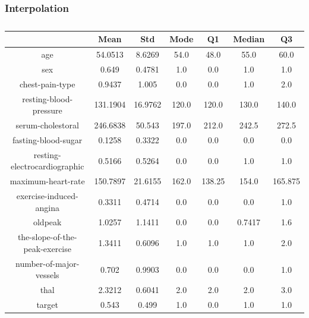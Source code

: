 \documentclass{classrep}
\begin{document}
{{            \subsubsection{Interpolation}
            \label{results:15-percent:interpolation} {
                \begin{table}[!htbp]
                    \centering
                    \begin{tabular}{|c|c|c|c|c|c|c|}
                        \hline
                        & Mean & Std & Mode & Q1 & Median & Q3 \\ \hline
                        age & 54.0513 & 8.6269 & 54.0 & 48.0 & 55.0 & 60.0 \\ \hline
                        sex & 0.649 & 0.4781 & 1.0 & 0.0 & 1.0 & 1.0 \\ \hline
                        chest-pain-type & 0.9437 & 1.005 & 0.0 & 0.0 & 1.0 & 2.0 \\ \hline
                        resting-blood-pressure & 131.1904 & 16.9762 & 120.0 & 120.0 & 130.0 & 140.0 \\ \hline
                        serum-cholestoral & 246.6838 & 50.543 & 197.0 & 212.0 & 242.5 & 272.5 \\ \hline
                        fasting-blood-sugar & 0.1258 & 0.3322 & 0.0 & 0.0 & 0.0 & 0.0 \\ \hline
                        resting-electrocardiographic & 0.5166 & 0.5264 & 0.0 & 0.0 & 1.0 & 1.0 \\ \hline
                        maximum-heart-rate & 150.7897 & 21.6155 & 162.0 & 138.25 & 154.0 & 165.875 \\ \hline
                        exercise-induced-angina & 0.3311 & 0.4714 & 0.0 & 0.0 & 0.0 & 1.0 \\ \hline
                        oldpeak & 1.0257 & 1.1411 & 0.0 & 0.0 & 0.7417 & 1.6 \\ \hline
                        the-slope-of-the-peak-exercise & 1.3411 & 0.6096 & 1.0 & 1.0 & 1.0 & 2.0 \\ \hline
                        number-of-major-vessels & 0.702 & 0.9903 & 0.0 & 0.0 & 0.0 & 1.0 \\ \hline
                        thal & 2.3212 & 0.6041 & 2.0 & 2.0 & 2.0 & 3.0 \\ \hline
                        target & 0.543 & 0.499 & 1.0 & 0.0 & 1.0 & 1.0 \\ \hline
                    \end{tabular}
                    \caption{}
                    \label{result_15_Interpolation}
                \end{table}
                \FloatBarrier

}}}
\end{document}
